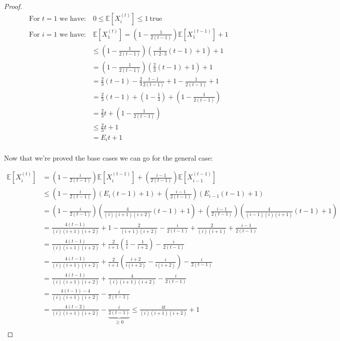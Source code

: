 \documentclass[]{article}
\begin{document}
\begin{proof}
\begingroup
\addtolength{\jot}{1em}
\begin{align*}
\text{For }t = 1 \text{ we have:}&\ 0\leq \mathbb{E}\left[X_i^{(t)} \right] \leq 1\ \text{true}\\
\text{For }i = 1 \text{ we have:}&\ \mathbb{E}\left[X_1^{(t)} \right] =  \left( 1 - \frac{1}{2(t-1)}\right)\mathbb{E}\left[X_1^{(t-1)} \right] + 1\\
&\leq \left( 1 - \frac{1}{2(t-1)}\right)\left(\frac{4}{1\cdot2\cdot3}(t-1)+1\right) + 1\\
&= \left( 1 - \frac{1}{2(t-1)}\right)\left(\frac{2}{3}(t-1)+1\right) + 1\\
&= \frac{2}{3}(t-1) - \frac{2}{3}\frac{t-1}{2(t-1)} + 1 - \frac{1}{2(t-1)} + 1\\
&= \frac{2}{3}(t-1) + \left(1- \frac{1}{3}\right) + \left(1 - \frac{1}{2(t-1)}\right)\\
&= \frac{2}{3}t + \left(1 - \frac{1}{2(t-1)}\right)\\
&\leq \frac{2}{3}t  + 1\\
&= E_i t + 1\\
\end{align*}
\endgroup

Now that we're proved the base cases we can go for the general case:

\begingroup
\addtolength{\jot}{1em}
\begin{align*}
\mathbb{E}\left[X_i^{(t)} \right] &=  \left( 1 - \frac{i}{2(t-1)}\right)\mathbb{E}\left[X_i^{(t-1)} \right] + \left(\frac{i-1}{2(t-1)}\right)\mathbb{E}\left[X_{i-1}^{(t-1)} \right]\\
&\leq \left( 1 - \frac{i}{2(t-1)}\right)\left(E_i (t-1) + 1\right) + \left(\frac{i-1}{2(t-1)}\right)\left(E_{i-1} (t-1) + 1\right)\\
&= \left( 1 - \frac{i}{2(t-1)}\right)\left(\frac{4}{(i)(i+1)(i+2)} (t-1) + 1\right) + \left(\frac{i-1}{2(t-1)}\right)\left(\frac{4}{(i-1)(i)(i+1)} (t-1) + 1\right)\\ 
&= \frac{4(t-1)}{(i)(i+1)(i+2)} + 1 - \frac{2}{(i+1)(i+2)} - \frac{i}{2(t-1)} + \frac{2}{(i)(i+1)} + \frac{i-1}{2(t-1)}\\
&= \frac{4(t-1)}{(i)(i+1)(i+2)} + \frac{2}{i+1}\left(\frac{1}{i} - \frac{1}{i+2}\right) - \frac{i}{2(t-1)} \\
&= \frac{4(t-1)}{(i)(i+1)(i+2)} + \frac{2}{i+1}\left(\frac{i+2}{i(i+2)} - \frac{i}{i(i+2)}\right) - \frac{i}{2(t-1)}\\
&= \frac{4(t-1)}{(i)(i+1)(i+2)} + \frac{4}{(i)(i+1)(i+2)} - \frac{i}{2(t-1)}\\
&= \frac{4(t-1) - 4}{(i)(i+1)(i+2)} - \frac{i}{2(t-1)}\\
&= \frac{4(t-2)}{(i)(i+1)(i+2)} - \underbrace{\frac{i}{2(t-1)}}_{\geq 0} \leq \frac{4t}{(i)(i+1)(i+2)} + 1\\
\end{align*}
\endgroup
\end{proof}
\end{document}
